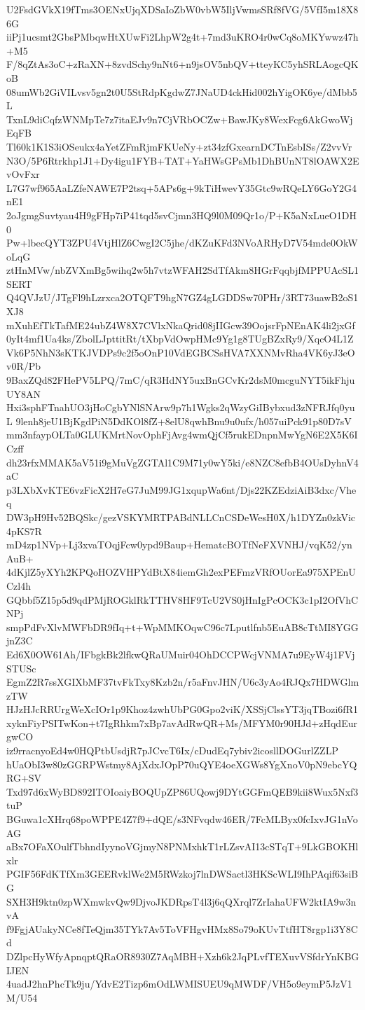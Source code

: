 U2FsdGVkX19fTms3OENxUjqXDSaIoZbW0vbW5IljVwmsSRf8fVG/5VfI5m18X86G
iiPj1ucsmt2GbsPMbqwHtXUwFi2LhpW2g4t+7md3uKRO4r0wCq8oMKYwwz47h+M5
F/8qZtAs3oC+zRaXN+8zvdSchy9nNt6+n9jsOV5nbQV+tteyKC5yhSRLAogcQKoB
08umWb2GiVILvsv5gn2t0U5StRdpKgdwZ7JNaUD4ckHid002hYigOK6ye/dMbb5L
TxnL9diCqfzWNMpTe7z7itaEJv9n7CjVRbOCZw+BawJKy8WexFcg6AkGwoWjEqFB
Tl60k1K1S3iOSeukx4aYetZFmRjmFKUeNy+zt34zfGxearnDCTnEsbISs/Z2vvVr
N3O/5P6Rtrkhp1J1+Dy4igu1FYB+TAT+YaHWsGPsMb1DhBUnNT8lOAWX2EvOvFxr
L7G7wf965AaLZfeNAWE7P2tsq+5APs6g+9kTiHwevY35Gtc9wRQeLY6GoY2G4nE1
2oJgmgSuvtyau4H9gFHp7iP41tqd5svCjmn3HQ9l0M09Qr1o/P+K5aNxLueO1DH0
Pw+lbecQYT3ZPU4VtjHlZ6CwgI2C5jhe/dKZuKFd3NVoARHyD7V54mde0OkWoLqG
ztHnMVw/nbZVXmBg5wihq2w5h7vtzWFAH2SdTfAkm8HGrFqqbjfMPPUAcSL1SERT
Q4QVJzU/JTgFl9hLzrxca2OTQFT9hgN7GZ4gLGDDSw70PHr/3RT73uawB2oS1XJ8
mXuhEfTkTafME24ubZ4W8X7CVlxNkaQrid08jIIGcw39OojsrFpNEnAK4li2jxGf
0yIt4mf1Ua4ks/ZbolLJpttitRt/tXbpVdOwpHMc9Yg1g8TUgBZxRy9/XqcO4L1Z
Vk6P5NhN3sKTKJVDPs9c2f5oOnP10VdEGBCSsHVA7XXNMvRha4VK6yJ3eOv0R/Pb
9BaxZQd82FHePV5LPQ/7mC/qR3HdNY5uxBnGCvKr2dsM0mcguNYT5ikFhjuUY8AN
Hxi3sphFTnahUO3jHoCgbYNlSNArw9p7h1Wgks2qWzyGiIBybxud3zNFRJfq0yuL
9lenh8jeU1BjKgdPiN5DdKOl8fZ+8elU8qwhBnu9u0ufx/h057uiPck91p80D7sV
mm3nfaypOLTa0GLUKMrtNovOphFjAvg4wmQjCf5rukEDnpnMwYgN6E2X5K6ICzff
dh23rfxMMAK5aV51i9gMuVgZGTAl1C9M71y0wY5ki/e8NZC8efbB4OUsDyhnV4aC
p3LXbXvKTE6vzFicX2H7eG7JuM99JG1xqupWa6nt/Djs22KZEdziAiB3dxc/Vheq
DW3pH9Hv52BQSkc/gezVSKYMRTPABdNLLCnCSDeWesH0X/h1DYZn0zkVic4pKS7R
mD4zp1NVp+Lj3xvaTOqjFcw0ypd9Baup+HematcBOTfNeFXVNHJ/vqK52/ynAuB+
4dKjlZ5yXYh2KPQoHOZVHPYdBtX84iemGh2exPEFmzVRfOUorEa975XPEnUCzl4h
GQbbf5Z15p5d9qdPMjROGklRkTTHV8HF9TcU2VS0jHnIgPcOCK3c1pI2OfVhCNPj
smpPdFvXlvMWFbDR9fIq+t+WpMMKOqwC96c7Lputlfnb5EuAB8cTtMI8YGGjnZ3C
Ed6X0OW61Ah/IFbgkBk2lfkwQRaUMuir04OhDCCPWcjVNMA7u9EyW4j1FVjSTUSc
EgmZ2R7ssXGIXbMF37tvFkTxy8Kzb2n/r5aFnvJHN/U6c3yAo4RJQx7HDWGlmzTW
HJzHJcRRUrgWeXcIOr1p9Khoz4zwhUbPG0Gpo2viK/XSSjClssYT3jqTBozi6fR1
xyknFiyPSITwKon+t7IgRhkm7xBp7avAdRwQR+Ms/MFYM0r90HJd+zHqdEurgwCO
iz9rracnyoEd4w0HQPtbUsdjR7pJCvcT6Ix/cDudEq7ybiv2icosllDOGurlZZLP
hUaObI3w80zGGRPWstmy8AjXdxJOpP70uQYE4oeXGWs8YgXnoV0pN9ebcYQRG+SV
Txd97d6xWyBD892ITOIoaiyBOQUpZP86UQowj9DYtGGFmQEB9kii8Wux5Nxf3tuP
BGuwa1cXHrq68poWPPE4Z7f9+dQE/s3NFvqdw46ER/7FcMLByx0fcIxvJG1nVoAG
aBx7OFaXOulfTbhndIyynoVGjmyN8PNMxhkT1rLZsvAI13cSTqT+9LkGBOKHlxlr
PGIF56FdKTfXm3GEERvklWe2M5RWzkoj7lnDWSactl3HKScWLI9IhPAqif63siBG
SXH3H9ktn0zpWXmwkvQw9DjvoJKDRpsT4l3j6qQXrql7ZrIahaUFW2ktIA9w3nvA
f9FgjAUakyNCe8fTeQjm35TYk7Av5ToVFHgvHMx8So79oKUvTtfHT8rgp1i3Y8Cd
DZlpcHyWfyApnqptQRaOR8930Z7AqMBH+Xzh6k2JqPLvfTEXuvVSfdrYnKBGIJEN
4uadJ2hnPhcTk9ju/YdvE2Tizp6mOdLWMISUEU9qMWDF/VH5o9eymP5JzV1M/U54
